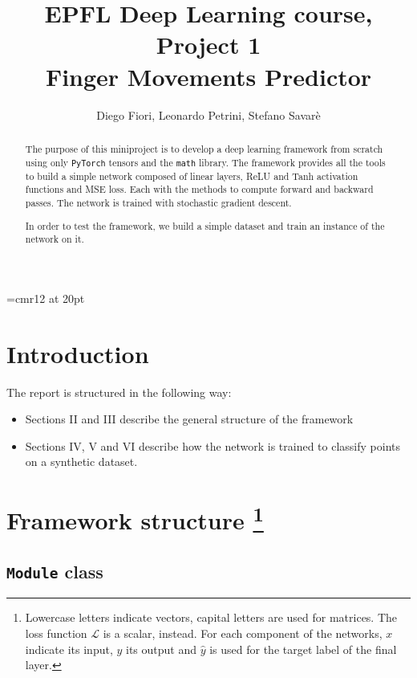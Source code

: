 \documentclass[11pt,conference,compsocconf]{IEEEtran}
\begin{document}
\font\myfont=cmr12 at 20pt
\title{\myfont EPFL Deep Learning course, Project 1 \\ Finger Movements Predictor}

\author{Diego Fiori, Leonardo Petrini, Stefano Savar\`{e}}

\maketitle

\begin{abstract}

    The purpose of this miniproject is to develop a deep learning framework from scratch using only \texttt{PyTorch} tensors and the \texttt{math} library. The framework provides all the tools to build a simple network composed of linear layers, ReLU and Tanh activation functions and MSE loss. Each with the methods to compute forward and backward passes. The network is trained with stochastic gradient descent.
    
    In order to test the framework, we build a simple dataset and train an instance of the network on it.

\end{abstract}

\section{Introduction}

The report is structured in the following way:

\begin{itemize}
    \item Sections II and III describe the general structure of the framework
    \item Sections IV, V and VI describe how the network is trained to classify points on a synthetic dataset.
\end{itemize}

\section{Framework structure 
\footnote{Lowercase letters indicate vectors, capital letters are used for matrices. The loss function $\mathcal{L}$ is a scalar, instead. For each component of the networks, $x$ indicate its input, $y$ its output and $\hat{y}$ is used for the target label of the final layer.}
}

\subsection{\texttt{Module} class}
\end{document}
